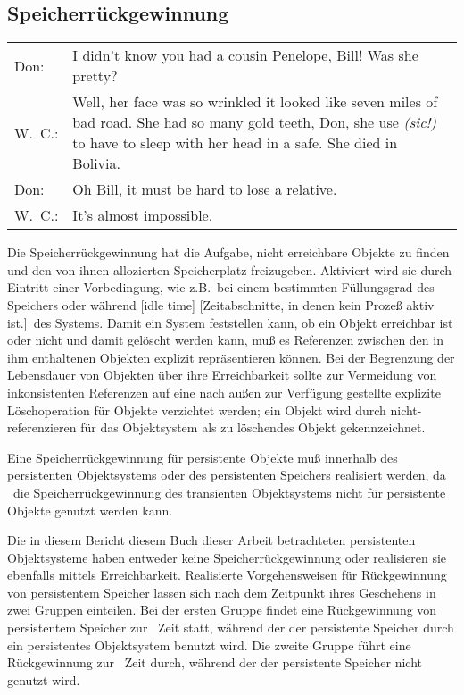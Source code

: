 \subsection{Speicherr\"{u}ckgewinnung}%
\label{sec:gc}%
%
\begin{fortune}[11cm]
\hfill\begin{tabular}{lp{9cm}}
Don:    & I didn't know you had a cousin Penelope, Bill!  Was she
          pretty?\\
W.\ C.: & Well, her face was so wrinkled it looked like seven miles of
          bad road.  She had so many gold teeth, Don, she use
          {\em (sic!)\/} to have to sleep with her head in a safe.
          She died in Bolivia.\\
Don:    & Oh Bill, it must be hard to lose a relative.\\
W.\ C.: & It's almost impossible.
\end{tabular}
\end{fortune}
%
Die Speicherr\"{u}ckgewinnung hat die Aufgabe, nicht erreichbare Objekte
zu finden und den von ihnen allozierten Speicherplatz freizugeben.
Aktiviert wird sie durch Eintritt einer Vorbedingung, wie z.B.\ bei
einem bestimmten F\"{u}llungsgrad des Speichers oder w\"{a}hrend
%
[idle time]%
[Zeitabschnitte, in denen kein Proze\ss{} aktiv ist.]\ des Systems.
Damit ein System feststellen kann, ob ein Objekt erreichbar ist oder
nicht und damit gel\"{o}scht werden kann, mu\ss{} es Referenzen zwischen den
in ihm enthaltenen Objekten explizit repr\"{a}sentieren k\"{o}nnen.  Bei der
Begrenzung der Lebensdauer von Objekten \"{u}ber ihre Erreichbarkeit
sollte zur Vermeidung von inkonsistenten Referenzen auf eine nach
au\ss{}en zur Verf\"{u}gung gestellte explizite L\"{o}schoperation f\"{u}r Objekte
verzichtet werden; ein Objekt wird durch nicht-referenzieren f\"{u}r das
Objektsystem als zu l\"{o}schendes Objekt gekennzeichnet.
%
\par{}Eine Speicherr\"{u}ckgewinnung f\"{u}r persistente Objekte mu\ss{}
innerhalb des persistenten Objektsystems oder des persistenten
Speichers realisiert werden, da \ia\ die
Spei\-cher\-r\"{u}ck\-ge\-win\-nung des transienten Objektsystems nicht
f\"{u}r persistente Objekte genutzt werden kann.
%
\par{}Die in \ifbericht diesem Bericht \else\ifbuch diesem Buch \else
dieser Arbeit \fi\fi betrachteten persistenten Objektsysteme haben
entweder keine Speicherr\"{u}ckgewinnung oder realisieren sie
ebenfalls mittels Erreichbarkeit. Realisierte Vorgehensweisen f\"{u}r
R\"{u}ckgewinnung von persistentem Speicher lassen sich nach dem
Zeitpunkt ihres Geschehens in zwei Gruppen einteilen. Bei der ersten
Gruppe findet eine R\"{u}ckgewinnung von persistentem Speicher zur
\online\ Zeit statt, w\"{a}hrend der der persistente Speicher durch
ein persistentes Objektsystem benutzt wird. Die zweite Gruppe
f\"{u}hrt eine R\"{u}ckgewinnung zur \offline\ Zeit durch, w\"{a}hrend
der der persistente Speicher nicht genutzt wird.
%
